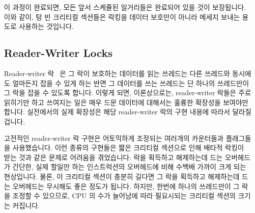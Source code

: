 {	이 과정이 완료되면, 모든 앞서 스케쥴된 일거리들은 완료되어 있을 것이
	보장됩니다.
	이와 같이, 텅 빈 크리티컬 섹션들은 락킹을 데이터 보호만이 아니라 메세지
	보내는 용도로 사용하는 것입니다.

} \QuickQuizEnd

\QuickQuizLabel{\QlockingQemptycriticalsection}

\subsection{Reader-Writer Locks}
\label{sec:locking:Reader-Writer Locks}

Reader-writer 락~\cite{Courtois71} 은 그 락이 보호하는 데이터를 읽는 쓰레드는
다른 쓰레드와 동시에도 얼마든지 잡을 수 있게 하는 반면 그 데이터를 쓰는
쓰레드는 단 하나의 쓰레드만이 그 락을 잡을 수 있도록 합니다.
이렇게 되면, 이론상으로는, reader-writer 락들은 주로 읽히기만 하고 쓰여지는
일은 매우 드문 데이터에 대해서는 훌륭한 확장성을 보여야만 합니다.
실전에서의 실제 확장성은 해당 reader-writer 락의 구현 내용에 따라서 달라질
겁니다.

고전적인 reader-writer 락 구현은 어토믹하게 조정되는 여러개의 카운터들과
플래그들을 사용했습니다.
이런 종류의 구현들은 짧은 크리티컬 섹션으로 인해 배타적 락킹이 받는 것과 같은
문제로 어려움을 겪었습니다: 락을 획득하고 해제하는데 드는 오버헤드가 간단한,
실제 할일만 하는 인스트럭션의 오버헤드에 비해 수백배 가까이 크게 되는
현상입니다.
물론, 이 크리티컬 섹션이 충분히 길다면 그 락을 획득하고 해제하는데 드는
오버헤드는 무시해도 좋은 정도가 됩니다.
하지만, 한번에 하나의 쓰레드만이 그 락을 조정할 수 있으므로, CPU 의 수가
늘어남에 따라 필요시되는 크리티컬 섹션의 크기는 커집니다.

